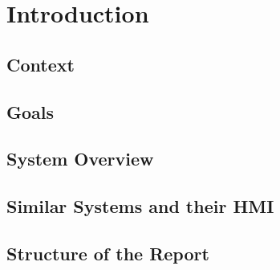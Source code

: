 \chapter{Introduction}\label{sec:introduction}


\section{Context}
\label{sec:context}

\section{Goals}
\label{sec:goals}

\section{System Overview}
\label{sec:system overview}

\section{Similar Systems and their HMI}
\label{sec:similar systems}

\section{Structure of the Report}
\label{structure}